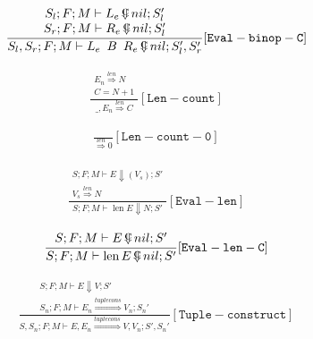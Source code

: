 \documentclass{scrartcl}
\DeclareMathOperator{\lenop}{len}
\DeclareMathOperator{\ceval}{\overset{C}{\smash{\Downarrow}}}
\begin{document}
    \begin{align*}
    \frac{
        \begin{matrix}
        S_l; F; M \vdash L_e  \ceval nil; S_l' \\
        S_r; F; M \vdash R_e  \ceval nil; S_l' \\
        \end{matrix}
    }{
        S_l, S_r; F; M \vdash L_e \enspace B \enspace R_e  \ceval nil; S_l', S_r'
    }[\mathtt{Eval-binop-C}]
    \end{align*}
    
    \begin{align*}
    \frac{
        \begin{matrix}
        E_n \overset{len}{\Rightarrow} N \\
        C = N+1
        \end{matrix}
    }{
        \_, E_n \overset{len}{\Rightarrow} C
    }[\mathtt{Len-count}]
    \end{align*}
    
    \begin{align*}
    \frac{}{
        \overset{len}{\Rightarrow} 0
    }[\mathtt{Len-count-0}]
    \end{align*}
    
    \begin{align*}
    \frac{
        \begin{matrix}
        S; F; M \vdash E \Downarrow ( V_s ); S' \\
        V_s \overset{len}{\Rightarrow} N
        \end{matrix}
    }{
        S; F; M \vdash \lenop E \Downarrow N; S'
    }[\mathtt{Eval-len}]
    \end{align*}
    
    \begin{align*}
    \frac{
        \begin{matrix}
        S; F; M \vdash E \ceval nil; S'
        \end{matrix}
    }{
        S; F; M \vdash \lenop E \ceval nil; S'
    }[\mathtt{Eval-len-C}]
    \end{align*}
    
    \begin{align*}
    \frac{
        \begin{matrix}
        S; F; M \vdash E \Downarrow V; S' \\
        S_n; F; M \vdash E_n \overset{tuplecons}{\Rightarrow} V_n; S_n'
        \end{matrix}
    }{
        S, S_n; F; M \vdash E, E_n \overset{tuplecons}{\Rightarrow} V, V_n; S', S_n'
    }[\mathtt{Tuple-construct}]
    \end{align*}
    
\end{document}
